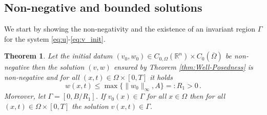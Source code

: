 \documentclass[11pt, a4paper]{article}
\theoremstyle{break}
\newtheorem{thm}{Theorem}[section]
\theoremstyle{break}
\theoremstyle{break}
\theoremstyle{break}
\theoremstyle{break}
\theoremstyle{break}
\theoremstyle{break}
\theoremstyle{break}
\theoremstyle{break}
\begin{document}
\subsection{Non-negative and bounded solutions} 
We start by showing the non-negativity and the existence of an invariant region $\Gamma$ for the system \eqref{eq:u}-\eqref{eq:v_init}.
\begin{thm}
    \label{thm:Non-negativity}
     Let the initial datum $(v_0, w_0) \in C_{0, \Omega}(\mathbb{R}^n) \times C_0(\overline{\Omega})$ be non-negative then the solution $(v, w)$ ensured by  Theorem \ref{thm:Well-Posedness} is non-negative and for all $(x, t) \in \Omega \times [0, T]$ it holds
     \begin{equation}
         w(x,t) \leq \max\{\|w_0\|_\infty, A\} =: R_1 >0\,.
     \end{equation}
     Moreover, let  $\Gamma = [0, B/R_1]$. If  $v_0(x) \in \Gamma$ for all $x \in \Omega$ then for all $(x, t) \in \Omega \times [0, T]$ the solution $v(x,t) \in \Gamma$.
\end{thm}
\end{document}

